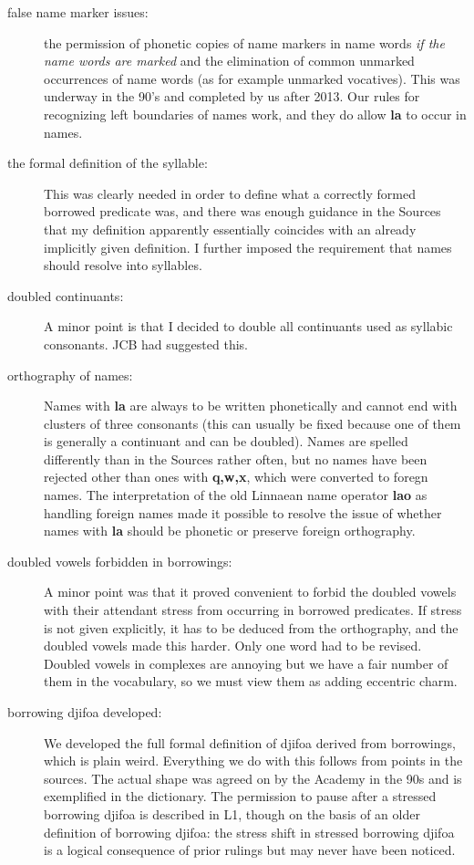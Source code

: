 \documentclass[12pt]{book}
\begin{document}
\begin{description}

\item[false name marker issues:]   the permission of phonetic copies of name markers in name words {\em if the name words are marked\/} and the elimination of common unmarked occurrences of name
words (as for example unmarked vocatives).  This was underway in the 90's and completed by us after 2013.  Our rules for recognizing left boundaries of names work, and they do allow
{\bf la} to occur in names.

\item[the formal definition of the syllable:]  This was clearly needed in order to define what a correctly formed borrowed predicate was, and there was enough guidance in the Sources that my definition apparently essentially coincides with an already implicitly given definition.  I further imposed the requirement that names should resolve into syllables.

\item[doubled continuants:]  A minor point is that I decided to double all continuants used as syllabic consonants.  JCB had suggested this.

\item[orthography of names:]  Names with {\bf la} are always to be written phonetically and cannot end with clusters of three consonants (this can usually be fixed because one of them is generally a continuant and can be doubled).  Names are spelled differently than in the Sources rather often, but no names have been rejected other than ones with {\bf q,w,x}, which were converted to foregn names.  The interpretation of the old
Linnaean name operator {\bf lao} as handling foreign names made it possible to resolve the issue of whether names with {\bf la} should be phonetic or preserve foreign orthography.

\item[doubled vowels forbidden in borrowings:]  A minor point was that it proved convenient to forbid the doubled vowels with their attendant stress from occurring in borrowed predicates.  If stress is not given explicitly, it has to be deduced from the orthography, and the doubled vowels made this harder.  Only one word had to be revised.  Doubled vowels in complexes are annoying but we have a fair number of them in the vocabulary, so we must view them as adding eccentric charm.

\item[borrowing djifoa developed:]  We developed the full formal definition of djifoa derived from borrowings, which is plain weird.  Everything we do with this follows from points in the sources.  The actual shape was agreed on by the Academy in the 90s and is exemplified in the dictionary.  The permission to pause after a stressed borrowing djifoa is described in L1,
though on the basis of an older definition of borrowing djifoa:  the stress shift in stressed borrowing djifoa is a logical consequence of prior rulings but may never have been noticed.


\end{description}
\end{document}
